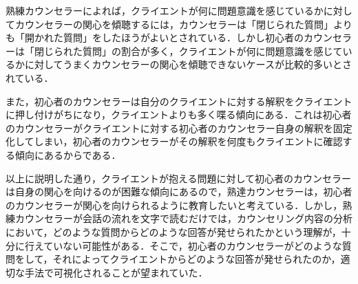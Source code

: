 \documentclass[shuuron]{kuee}
\begin{document}
熟練カウンセラーによれば，クライエントが何に問題意識を感じているかに対してカウンセラーの関心を傾聴するには，カウンセラーは「閉じられた質問」よりも「開かれた質問」をしたほうがよいとされている\cite{ivey}．しかし初心者のカウンセラーは「閉じられた質問」の割合が多く，クライエントが何に問題意識を感じているかに対してうまくカウンセラーの関心を傾聴できないケースが比較的多いとされている．


また，初心者のカウンセラーは自分のクライエントに対する解釈をクライエントに押し付けがちになり，クライエントよりも多く喋る傾向にある．これは初心者のカウンセラーがクライエントに対する初心者のカウンセラー自身の解釈を固定化してしまい，初心者のカウンセラーがその解釈を何度もクライエントに確認する傾向にあるからである．

以上に説明した通り，クライエントが抱える問題に対して初心者のカウンセラーは自身の関心を向けるのが困難な傾向にあるので，熟達カウンセラーは，初心者のカウンセラーが関心を向けられるように教育したいと考えている．しかし，熟練カウンセラーが会話の流れを文字で読むだけでは，カウンセリング内容の分析において，どのような質問からどのような回答が発せられたかという理解が，十分に行えていない可能性がある．そこで，初心者のカウンセラーがどのような質問をして，それによってクライエントからどのような回答が発せられたのか，適切な手法で可視化されることが望まれていた．

\end{document}
